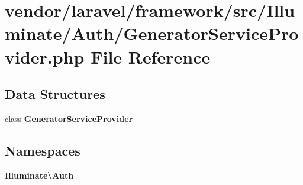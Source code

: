 \section{vendor/laravel/framework/src/\+Illuminate/\+Auth/\+Generator\+Service\+Provider.php File Reference}
\label{_auth_2_generator_service_provider_8php}
\subsection*{Data Structures}
\begin{DoxyCompactItemize}
\item 
class {\bf Generator\+Service\+Provider}
\end{DoxyCompactItemize}
\subsection*{Namespaces}
\begin{DoxyCompactItemize}
\item 
 {\bf Illuminate\textbackslash{}\+Auth}
\end{DoxyCompactItemize}
